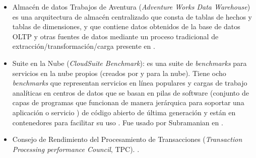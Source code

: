 \documentclass[12pt, letter paper]{report}
\begin{document}
\begin{itemize}
            telecomunicaciones (\textit{Telecom Application Transaction
            Processing Benchmark}, TATP) está diseñado para medir el rendimiento
            de una combinación relacional DBMS/OS/Hardware en una aplicación de
            telecomunicaciones típica (procesamiento de transacciones en línea,
            \textit{On Line Transaction Processing}, OLTP) \cite{wolskitatp2009,
            kissingeradaptive2018}.
            \item Almacén de datos Trabajos de Aventura (\textit{Adventure Works
            Data Warehouse}) es una arquitectura de almacén centralizado que
            consta de tablas de hechos y tablas de dimensiones, y que contiene
            datos obtenidos de la base de datos OLTP y otras fuentes de datos
            mediante un proceso tradicional de extracción/transformación/carga
            \cite{mitriactive2015, mashamsftadventureworks2025} presente en
            \cite{saraivaeconomic2017}.
            \item Suite en la Nube (\textit{CloudSuite Benchmark}): es una suite
            de \textit{benchmarks} para servicios en la nube propios (creados
            por y para la nube). Tiene ocho \textit{benchmarks} que representan
            servicios en línea populares y cargas de trabajo analíticas en
            centros de datos que se basan en pilas de software (conjunto de
            capas de programas que funcionan de manera jerárquica para soportar
            una aplicación o servicio \cite{ferdinandi2012cloudsuite}) de código
            abierto de última generación y están en contenedores para facilitar
            su uso \cite{epflparsacloudsuite2025,
            parsaepflparsa-epflcloudsuite2025}. Fue usado por Subramanian en
            \cite{subramaniamenergy2015-1}.
            \item Consejo de Rendimiento del Procesamiento de Transacciones
            (\textit{Transaction Processing performance Council}, TPC).
            \cite{xuexploring2010, niemanndoes2013, duarteevaluating2018,
            guoenergy-efficient2023, guoenergy2024, tranenergy2025,
            oneilstar2009, poessnew2000, poessenergy2008}.
          \end{itemize}
\end{document}
